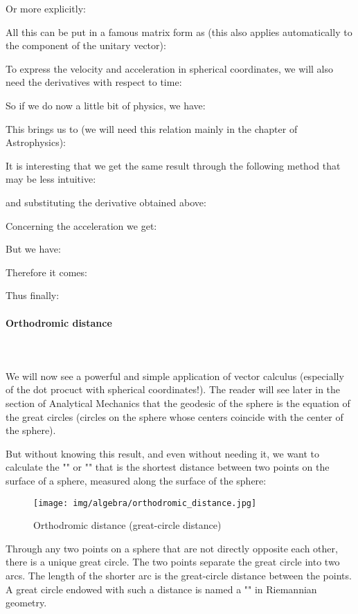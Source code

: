	Or more explicitly:
	
	
	All this can be put in a famous matrix form as (this also applies automatically to the component of the unitary vector):
	
	To express the velocity and acceleration in spherical coordinates, we will also need the derivatives with respect to time:
	
	So if we do now a little bit of physics, we have:
	
	This brings us to (we will need this relation mainly in the chapter of Astrophysics):
	
	It is interesting that we get the same result through the following method that may be less intuitive:
	
	and substituting the derivative obtained above:
	
	Concerning the acceleration we get:
	
	But we have:
	
	Therefore it comes:
	

	Thus finally:
	
	
	\paragraph{Orthodromic distance}\mbox{}\\\\
	We will now see a powerful and simple application of vector calculus (especially of the dot procuct with spherical coordinates!). The reader will see later in the section of Analytical Mechanics that the geodesic of the sphere is the equation of the great circles (circles on the sphere whose centers coincide with the center of the sphere).

	But without knowing this result, and even without needing it, we want to calculate the "" or "" that is the shortest distance between two points on the surface of a sphere, measured along the surface of the sphere:
	\begin{figure}[H]
		\centering
		\texttt{[image: img/algebra/orthodromic\_distance.jpg]}
		\caption{Orthodromic distance (great-circle distance)}
	\end{figure}
	Through any two points on a sphere that are not directly opposite each other, there is a unique great circle. The two points separate the great circle into two arcs. The length of the shorter arc is the great-circle distance between the points. A great circle endowed with such a distance is named a "" in Riemannian geometry.
	
